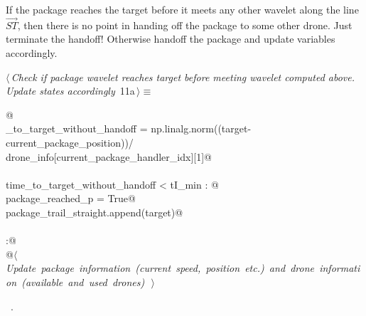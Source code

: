 \documentclass[10pt, english, oneside]{report}
\begin{document}
If the package reaches the target before it meets any other wavelet along the line $\vec{ST}$, then there is no point in 
handing off the package to some other drone. Just terminate the handoff! Otherwise handoff the package and update
variables accordingly.  


\begin{flushleft} \small
\begin{minipage}{\linewidth}\label{scrap8}\raggedright\small
{} $\langle\,${\itshape Check if package wavelet reaches target before meeting wavelet computed above. Update states accordingly}\nobreak\ {\footnotesize {11a}}$\,\rangle\equiv$
\vspace{-1ex}
\begin{list}{}{} \item
\mbox{}\verb@   @\\
\mbox{}\verb@time_to_target_without_handoff = np.linalg.norm((target-current_package_position))/ \@\\
\mbox{}\verb@                                 drone_info[current_package_handler_idx][1]@\\
\mbox{}\verb@@\\
\mbox{}\verb@if time_to_target_without_handoff < tI_min : @\\
\mbox{}\verb@     package_reached_p = True@\\
\mbox{}\verb@     package_trail_straight.append(target)@\\
\mbox{}\verb@@\\
\mbox{}\verb@else:@\\
\mbox{}\verb@     @\hbox{$\langle\,${\itshape Update package information (current speed, position etc.) and drone information (available and used drones)}\nobreak\ {\footnotesize {}}$\,\rangle$}\verb@@\\
\mbox{}\verb@@{\NWsep}
\end{list}
\vspace{-1.5ex}
\footnotesize
\begin{list}{}{\setlength{\itemsep}{-\parsep}\setlength{\itemindent}{-\leftmargin}}
\item \NWtxtMacroRefIn\ .

\item{}
\end{list}
\end{minipage}\vspace{4ex}
\end{flushleft}
\end{document}

